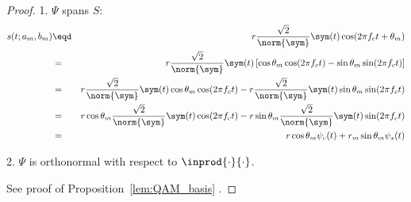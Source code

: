 \begin{proof}

1. $\Psi$ spans $S$:
\begin{eqnarray*}
   s(t;a_m,b_m) 
     &\eqd& r\frac{\sqrt{2}}{\norm{\sym}} \sym(t) \cos(2\pi f_c t + \theta_m)
   \\&=&    r\frac{\sqrt{2}}{\norm{\sym}} \sym(t) 
            \left[ \cos\theta_m\cos(2\pi f_ct)-\sin\theta_m\sin(2\pi f_ct)\right]  
   \\&=&    r\frac{\sqrt{2}}{\norm{\sym}} \sym(t)\cos\theta_m\cos(2\pi f_ct) - 
            r\frac{\sqrt{2}}{\norm{\sym}} \sym(t)\sin\theta_m\sin(2\pi f_ct)
   \\&=&    r\cos\theta_m\frac{\sqrt{2}}{\norm{\sym}} \sym(t)\cos(2\pi f_ct) - 
            r\sin\theta_m\frac{\sqrt{2}}{\norm{\sym}} \sym(t)\sin(2\pi f_ct)
   \\&=&    r\cos\theta_m \psi_c(t) + r_m\sin\theta_m \psi_s(t)
\end{eqnarray*}

2. $\Psi$ is orthonormal with respect to $\inprod{\cdot}{\cdot}$.

See proof of Proposition~\ref{lem:QAM_basis} .

\end{proof}




